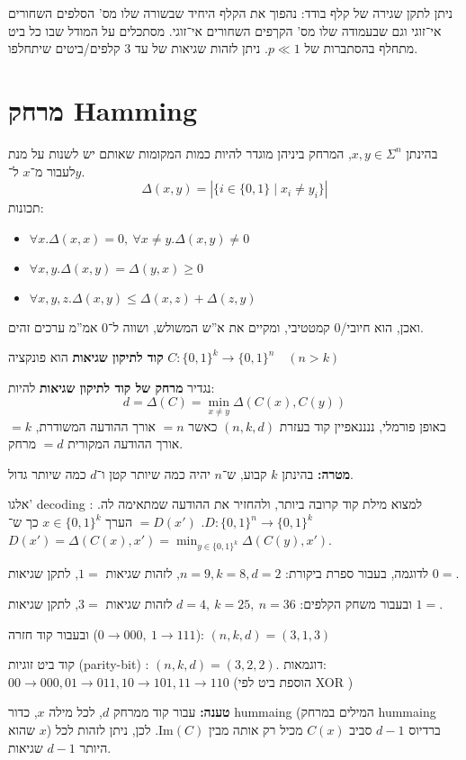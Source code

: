 \documentclass[]{article}
\newcommand\sen   {\selectlanguage{english}}
\newcommand\she   {\selectlanguage{hebrew}}
\newcommand\del   {$ \!\! $}
\newcommand\Si    {\Sigma}
\newcommand\Img   {\text{Im}}
\begin{document}
	ניתן לתקן שגירה של קלף בודד: נהפוך את הקלף היחיד שבשורה שלו מס' הסלפים השחורים אי־זוגי וגם שבעמודה שלו מס' הקךפים השחורים אי־זוגי. 
	מסתכלים על המודל שבו כל ביט מתחלף בהסתברות של $p\ll1$. ניתן לזהות שגיאות של עד $3$ קלפים/ביטים שיתחלפו. 
	
	\section{מרחק Hamming}
	בהינתן $x, y \in \Si^n$, המרחק ביניהן מוגדר להיות כמות המקומות שאותם יש לשנות על מנת לעבור מ־$x$ ל־$y$. 
	\[ \Delta(x, y) = |\{i \in \{0, 1\} \mid x_i \neq y_i\}| \]
	תכונות: 
	\sen
	\begin{itemize}
		\item $\forall x. \Delta(x, x) = 0, \ \forall x \neq y. \Delta(x, y) \neq 0$
		\item $\forall x, y. \Delta(x, y) = \Delta(y, x) \ge 0$
		\item $\forall x, y, z. \Delta(x, y) \le \Delta(x, z) + \Delta(z, y) $
	\end{itemize}
	\she
	ואכן, הוא חיובי/0 קמטטיבי, ומקיים את א''ש המשולש, ושווה ל־0 אמ''מ ערכים זהים. 
	
	\textbf{קוד לתיקון שגיאות} הוא פונקציה $C \colon \{0, 1\}^{k} \to \{0, 1\}^{n} \quad (n>k)$ 
	
	נגדיר \textbf{מרחק של קוד לתיקון שגיאות} להיות: 
	\[ d = \Delta(C) = \min_{x \neq y} \Delta(C(x), C(y)) \]
	באופן פורמלי, ננננאפיין קוד בעזרת $(n, k, d)$ כאשר $=n$ אורך ההודעה המשודרת, $=k$ אורך ההודעה המקורית $=d$ מרחק. 
	
	\textbf{מטרה: }בהינתן $k$ קבוע, ש־$n$ יהיה כמה שיותר קטן ו־$d$ כמה שיותר גדול. 
	
	אלגו' decoding \del: למצוא מילת קוד קרובה ביותר, ולהחזיר את ההודעה שמתאימה לה. $D \colon \{0, 1\}^{n} \to \{0,  1\}^{k}$. $=D(x')$ הערך $x \in \{0, 1\}^{k}$ כך ש־$D(x') = \Delta(C(x), x') = \min_{y \in \{0, 1\}^{k}}\Delta(C(y), x')$. 
	
	לדוגמה, בעבור ספרת ביקורת: 
	$n = 9, k = 8, d = 2$, לזהות שגיאות $1=$, לתקן שגיאות $0=$. 
	
	ובעבור משחק הקלפים: 
	$d = 4, \ k = 25, \ n = 36$ לזהות שגיאות $3=$, לתקן שגיאות $1=$. 
	
	ובעבור קוד חזרה ($0 \to 000, \ 1 \to 111$): 
	$(n, k, d) = (3, 1, 3)$
	
	קוד ביט זוגיות (parity-bit) \del: $(n, k, d) = (3, 2, 2)$. דוגמאות: 
	$00 \to 000, 01 \to 011, 10 \to 101, 11 \to 110$ (הוספת ביט לפי XOR \del)
	
	\textbf{טענה: }עבור קוד ממרחק $d$, לכל מילה $x$, כדור hummaing (המילים במרחק hummaing שהוא $x$) ברדיוס $d - 1$ סביב $C(x)$ מכיל רק אותה מבין $\Img(C)$. לכן, ניתן לזהות לכל היותר $d - 1 $ שגיאות. 
	
\end{document}
